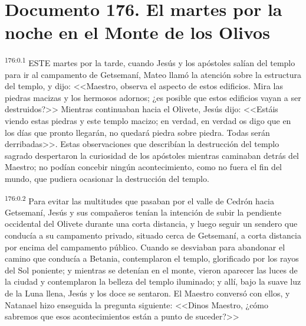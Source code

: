 \chapter{Documento 176. El martes por la noche en el Monte de los Olivos}
\par 
\textsuperscript{176:0.1} ESTE martes por la tarde, cuando Jesús y los apóstoles salían del templo para ir al campamento de Getsemaní, Mateo llamó la atención sobre la estructura del templo, y dijo: <<Maestro, observa el aspecto de estos edificios. Mira las piedras macizas y los hermosos adornos; ¿es posible que estos edificios vayan a ser destruidos?>> Mientras continuaban hacia el Olivete, Jesús dijo: <<Estáis viendo estas piedras y este templo macizo; en verdad, en verdad os digo que en los días que pronto llegarán, no quedará piedra sobre piedra. Todas serán derribadas>>. Estas observaciones que describían la destrucción del templo sagrado despertaron la curiosidad de los apóstoles mientras caminaban detrás del Maestro; no podían concebir ningún acontecimiento, como no fuera el fin del mundo, que pudiera ocasionar la destrucción del templo.

\par 
\textsuperscript{176:0.2} Para evitar las multitudes que pasaban por el valle de Cedrón hacia Getsemaní, Jesús y sus compañeros tenían la intención de subir la pendiente occidental del Olivete durante una corta distancia, y luego seguir un sendero que conducía a su campamento privado, situado cerca de Getsemaní, a corta distancia por encima del campamento público. Cuando se desviaban para abandonar el camino que conducía a Betania, contemplaron el templo, glorificado por los rayos del Sol poniente; y mientras se detenían en el monte, vieron aparecer las luces de la ciudad y contemplaron la belleza del templo iluminado; y allí, bajo la suave luz de la Luna llena, Jesús y los doce se sentaron. El Maestro conversó con ellos, y Natanael hizo enseguida la pregunta siguiente: <<Dinos Maestro, ¿cómo sabremos que esos acontecimientos están a punto de suceder?>>

